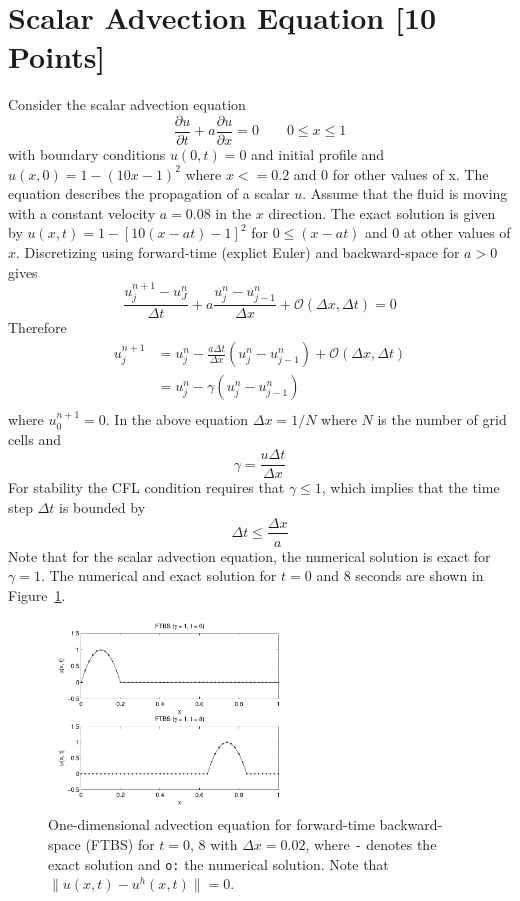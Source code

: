 \section{Scalar Advection Equation [10 Points]}
Consider the scalar advection equation
\[
  \frac{\partial u}{\partial t} + a \frac{\partial u}{\partial x} = 0 \qquad 0 \le x \le 1
\]
with boundary conditions $u(0, t) = 0$ and initial profile and $u(x,0)= 1 - (10x - 1)^2$ where $x <= 0.2$ and 0 for other values of x.
The equation describes the propagation of a scalar $u$. Assume that the fluid is moving with a constant velocity $a = 0.08$ in the $x$ direction. The exact solution is given by
$ u(x, t) =  1 - [10(x - at) - 1]^2$ for $ 0 \le (x - at)$ and $0$ at other values of $x$.
Discretizing using forward-time (explict Euler) and backward-space for $a > 0$ gives
\[
  \frac{u_j^{n + 1} - u_J^{n}}{\Delta t} + a \frac{u_j^n - u_{j - 1}^n}{\Delta x} + \mathcal{O}(\Delta x, \Delta t) = 0
\]
Therefore
\begin{eqnarray}
  u_j^{n + 1} &= u_j^n - \frac{a \Delta t}{\Delta x}\left(u_{j}^n - u_{j - 1}^{n}\right)+ \mathcal{O}(\Delta x, \Delta t) \\
  &=  u_j^n - \gamma \left(u_{j}^n - u_{j - 1}^{n}\right) \\
  \label{eqn:discretization}
\end{eqnarray}
where $u_0^{n + 1} = 0$. In the above equation $\Delta x = 1/N$ where $N$ is the number of grid cells and
\[
  \gamma = \frac{u\Delta t}{\Delta x}
\]  
For stability the CFL condition requires that $\gamma \le 1$, which implies that the time step $\Delta t$ is bounded by
\[
  \Delta t \le \frac{\Delta x}{a}
\]
Note that for the scalar advection equation, the numerical solution is exact for $\gamma = 1$. The numerical and exact solution for $t = 0$ and $8$ seconds are shown in Figure~\ref{fig:q2_solution}.

\begin{figure}[h] \centering
  \includegraphics[width=0.60\textwidth]{./Fig/solution}
  \caption{One-dimensional advection equation for forward-time backward-space (FTBS) for $t = 0, \, 8$ with $\Delta x = 0.02$, where \texttt{-} denotes the exact solution and \texttt{o:} the numerical solution. Note that $\|u(x, t) - u^h(x, t)\| = 0$.}
  \label{fig:q2_solution}
\end{figure}

